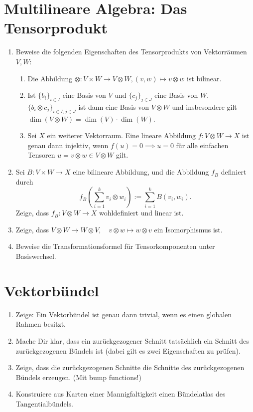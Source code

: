 \documentclass[a4paper]{scrartcl}
\begin{document}
	\section{Multilineare Algebra: Das Tensorprodukt}
	\begin{enumerate}
		\item Beweise die folgenden Eigenschaften des Tensorprodukts von Vektorräumen $V,W$:
			\begin{enumerate}[label=(\alph*)]
		\item Die Abbildung $\otimes\colon V\times W\to V\otimes W, (v,w) \mapsto v\otimes w$ ist bilinear.
		\item Ist $\{b_i\}_{i\in I}$ eine Basis von $V$ und $\{c_j\}_{j\in J}$ eine Basis von $W$. $\{b_i \otimes c_j\}_{i\in I, j\in J}$ ist dann eine Basis von $V\otimes W$ und insbesondere gilt $\dim(V\otimes W) = \dim(V) \cdot \dim(W)$.
		\item Sei $X$ ein weiterer Vektorraum. Eine lineare Abbildung $f\colon V\otimes W \to X$ ist genau dann injektiv, wenn $f(u) = 0 \implies u = 0$ für alle einfachen Tensoren $u = v\otimes w \in V\otimes W$ gilt.
		\end{enumerate}
			\item Sei $B\colon V\times W \to X$ eine bilineare Abbildung, und die Abbildung $f_B$ definiert durch 
		\[f_B\left(\sum_{i=1}^k v_i \otimes w_i\right) := \sum_{i=1}^k B(v_i,w_i).\]
			Zeige, dass $f_B\colon V\otimes W\rightarrow X$ wohldefiniert und linear ist.
			\item Zeige, dass $V\otimes W\rightarrow W\otimes V,\quad v\otimes w \mapsto w\otimes v$ ein Isomorphismus ist.
			\item Beweise die Transformationsformel für Tensorkomponenten unter Basiswechsel.
	\end{enumerate}
	\section{Vektorbündel}
	\begin{enumerate}
		\item Zeige: Ein Vektorbündel ist genau dann trivial, wenn es einen globalen Rahmen besitzt.
		\item Mache Dir klar, dass ein zurückgezogener Schnitt tatsächlich ein Schnitt des zurückgezogenen Bündels ist (dabei gilt es zwei Eigenschaften zu prüfen).
		\item Zeige, dass die zurückgezogenen Schnitte die Schnitte des zurückgezogenen Bündels erzeugen. (Mit bump functions!)
		\item Konstruiere aus Karten einer Mannigfaltigkeit einen Bündelatlas des Tangentialbündels.
	\end{enumerate}
\end{document}
